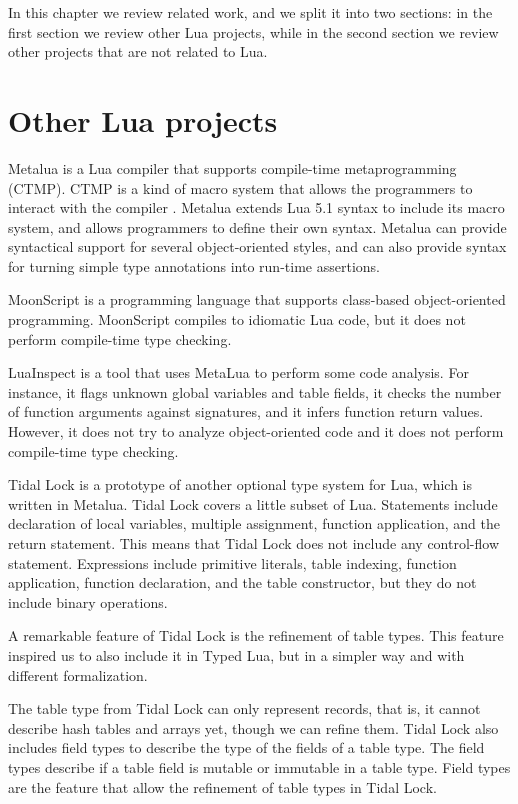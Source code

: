 In this chapter we review related work, and we split it into two sections:
in the first section we review other Lua projects,
while in the second section we review other projects that are not related to Lua.

\section{Other Lua projects}

Metalua \cite{metalua} is a Lua compiler that supports compile-time
metaprogramming (CTMP).
CTMP is a kind of macro system that allows the programmers to interact
with the compiler \cite{fleutot2007contrasting}.
Metalua extends Lua 5.1 syntax to include its macro system,
and allows programmers to define their own syntax.
Metalua can provide syntactical support for several object-oriented
styles, and can also provide syntax for turning simple type
annotations into run-time assertions.

MoonScript \cite{moonscript} is a programming language that supports
class-based object-oriented programming.
MoonScript compiles to idiomatic Lua code, but
it does not perform compile-time type checking.

LuaInspect \cite{luainspect} is a tool that uses MetaLua to perform
some code analysis.
For instance, it flags unknown global variables and table fields,
it checks the number of function arguments against signatures, and
it infers function return values.
However, it does not try to analyze object-oriented code and
it does not perform compile-time type checking.

Tidal Lock \cite{tidallock} is a prototype of another optional type
system for Lua, which is written in Metalua.
Tidal Lock covers a little subset of Lua.
Statements include declaration of local variables, multiple assignment,
function application, and the return statement.
This means that Tidal Lock does not include any control-flow statement.
Expressions include primitive literals, table indexing, function application,
function declaration, and the table constructor, but they do not include
binary operations.

A remarkable feature of Tidal Lock is the refinement of table types.
This feature inspired us to also include it in Typed Lua,
but in a simpler way and with different formalization.

The table type from Tidal Lock can only represent records, that is,
it cannot describe hash tables and arrays yet, though we can refine them.
Tidal Lock also includes field types to describe the type of the fields
of a table type.
The field types describe if a table field is mutable or immutable
in a table type.
Field types are the feature that allow the refinement of table types in
Tidal Lock.

